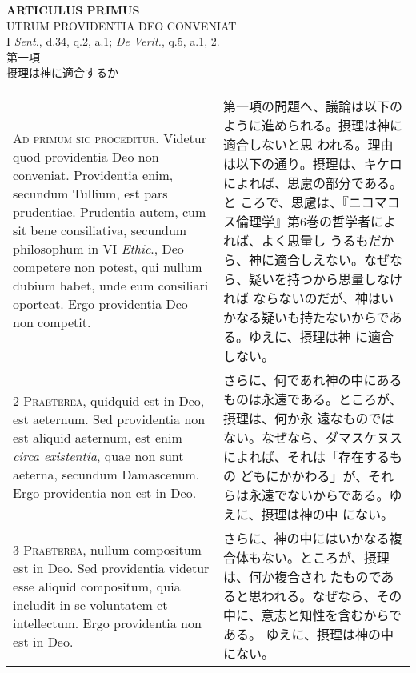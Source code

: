 \documentclass[10pt]{jsarticle} %
\begin{document}
\begin{center}
 {\Large {\bf ARTICULUS PRIMUS}}\\
 {\large UTRUM PROVIDENTIA DEO CONVENIAT}\\
 {\footnotesize I {\itshape Sent.}, d.34, q.2, a.1; {\itshape De
 Verit.}, q.5, a.1, 2.}\\
 {\Large 第一項\\摂理は神に適合するか}
\end{center}

\begin{longtable}{p{21em}p{21em}}




{\Huge A}{\scshape d primum sic proceditur}. Videtur quod
providentia Deo non conveniat. Providentia enim, secundum Tullium, est
pars prudentiae. Prudentia autem, cum sit bene consiliativa, secundum
philosophum in VI {\itshape Ethic}., Deo competere non potest, qui nullum dubium
habet, unde eum consiliari oporteat. Ergo providentia Deo non competit.


&

第一項の問題へ、議論は以下のように進められる。摂理は神に適合しないと思
われる。理由は以下の通り。摂理は、キケロによれば、思慮の部分である。と
ころで、思慮は、『ニコマコス倫理学』第6巻の哲学者によれば、よく思量し
うるもだから、神に適合しえない。なぜなら、疑いを持つから思量しなければ
ならないのだが、神はいかなる疑いも持たないからである。ゆえに、摂理は神
に適合しない。

\\


{\scshape 2 Praeterea}, quidquid est in Deo, est
aeternum. Sed providentia non est aliquid aeternum, est enim {\itshape circa
existentia}, quae non sunt aeterna, secundum Damascenum. Ergo providentia
non est in Deo.


&

さらに、何であれ神の中にあるものは永遠である。ところが、摂理は、何か永
遠なものではない。なぜなら、ダマスケヌスによれば、それは「存在するもの
どもにかかわる」が、それらは永遠でないからである。ゆえに、摂理は神の中
にない。


\\


{\scshape 3 Praeterea}, nullum compositum est in
Deo. Sed providentia videtur esse aliquid compositum, quia includit in
se voluntatem et intellectum. Ergo providentia non est in Deo.


&

さらに、神の中にはいかなる複合体もない。ところが、摂理は、何か複合され
たものであると思われる。なぜなら、その中に、意志と知性を含むからである。
ゆえに、摂理は神の中にない。



\end{longtable}
\end{document}
